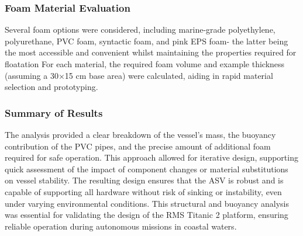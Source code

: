 \subsubsection{Foam Material Evaluation}

Several foam options were considered, including marine-grade polyethylene, polyurethane, PVC foam, syntactic foam, and pink EPS foam- the latter being the most accessible and convenient whilst maintaining the properties required for floatation
For each material, the required foam volume and example thickness (assuming a 30$\times$15 cm base area) were calculated, aiding in rapid material selection and prototyping.

\subsubsection{Summary of Results}

The analysis provided a clear breakdown of the vessel's mass, the buoyancy contribution of the PVC pipes, and the precise amount of additional foam required for safe operation.
This approach allowed for iterative design, supporting quick assessment of the impact of component changes or material substitutions on vessel stability.
The resulting design ensures that the ASV is robust and is capable of supporting all hardware without risk of sinking or instability, even under varying environmental conditions.
This structural and buoyancy analysis was essential for validating the design of the RMS Titanic 2 platform, ensuring reliable operation during autonomous missions in coastal waters.

